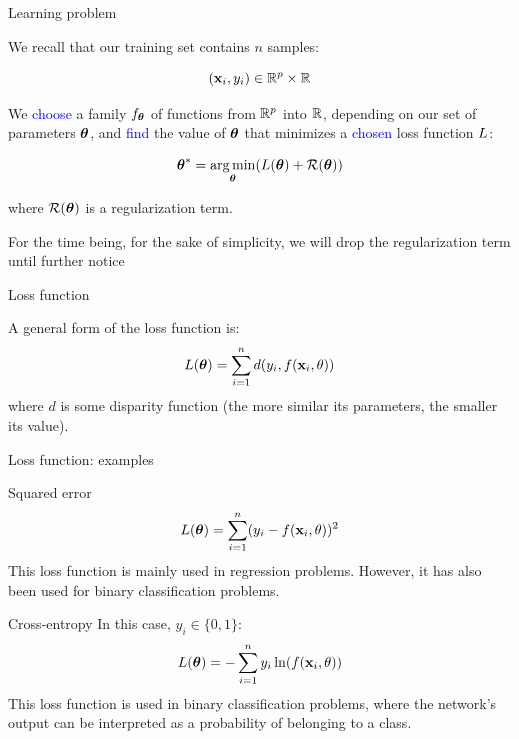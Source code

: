 \documentclass[xcolor=pdftex,dvipsnames,table,mathserif]{beamer}
\begin{document}
\begin{frame}{Learning problem}

  We recall that our training set contains $n$ samples:

  \[
  (\mathbf{x}_i, y_i) \in \mathbb{R}^p \times \mathbb{R}
  \]

  We \textcolor{blue}{choose} a family $f_{\boldsymbol{\theta}}$
  of functions from $\mathbb{R}^p$ into $\mathbb{R}$,
  depending on our set of parameters $\boldsymbol{\theta}$,
  and \textcolor{blue}{find} the value of $\boldsymbol{\theta}$
  that minimizes a \textcolor{blue}{chosen} loss function $L$:

\[
\boldsymbol{\theta} ^{\ast} = \operatorname*{arg\,min}_{\boldsymbol{\theta}} ( L (\boldsymbol{\theta}) + \mathcal{R}(\boldsymbol{\theta}) )
\]

where $\mathcal{R}(\boldsymbol{\theta})$ is a regularization term.

\vspace{1em}

\small{For the time being, for the sake of simplicity, we will drop the regularization term until further notice}

\end{frame}

\begin{frame}{Loss function}

  A general form of the loss function is:
  \[
  L(\boldsymbol{\theta}) = \sum\limits_{i=1}^n d(y_i, f(\mathbf{x}_i, \theta))
  \]
  where $d$ is some disparity function (the more similar its parameters, the smaller its value).

\end{frame}


\begin{frame}{Loss function: examples}


  \begin{block}{Squared error}
    \[
    L(\boldsymbol{\theta}) = \sum\limits_{i=1}^n (y_i - f(\mathbf{x}_i, \theta))^2
    \]
    This loss function is mainly used in regression problems. However, it has also been used for binary classification problems.
  \end{block}

  \begin{block}{Cross-entropy}
    In this case, $y_i \in \{0, 1\}$:
    \[
    L(\boldsymbol{\theta}) = -\sum\limits_{i=1}^n y_i \ln( f(\mathbf{x}_i, \theta) )
    \]
    This loss function is used in binary classification problems, where the network's output can be interpreted as a probability of belonging to a class.
  \end{block}

\end{frame}
\end{document}
